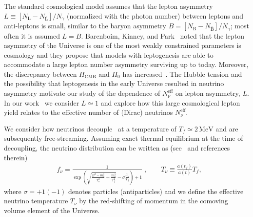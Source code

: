 The standard cosmological model assumes that the lepton asymmetry $L\equiv  [N_\mathrm{L}-N_{\overline{\mathrm{L}}}] /N_\gamma $  (normalized with the photon number) 
between leptons and anti-leptons is small, similar to the baryon asymmetry $B=[N_\mathrm{B}-N_{\overline{\mathrm{B}}}]/N_\gamma $; most often it is assumed $L=B$. Barenboim, Kinney, and Park~\cite{Barenboim:2016shh,Barenboim:2017dfq} noted that the lepton asymmetry of the Universe is one of the most weakly constrained parameters is cosmology and they propose that models with leptogenesis are able to accommodate a large lepton number asymmetry surviving up to today.  Moreover, the discrepancy between $H_\mathrm{CMB}$ and $H_0$ has increased~\cite{riess2018new,Riess:2018byc,Planck:2018vyg}. The Hubble tension and the possibility that leptogenesis in the early Universe resulted in neutrino asymmetry motivate our study of the dependence of $N_\nu^{\mathrm{eff}}$ on lepton asymmetry, $L$. In our work~\cite{Yang:2018oqg} we consider $L\simeq 1$ and explore how this large cosmological lepton yield relates to the effective number of (Dirac) neutrinos $N^{\mathrm{eff}}_\nu$. 

 We consider how neutrinos decouple~\cite{Birrell:2014gea} at a temperature of $T_f\simeq 2\,\mathrm{MeV}$ and are subsequently free-streaming. Assuming exact thermal equilibrium at the time of decoupling, the neutrino distribution can be   written as (see~\cite{Birrell:2012gg} and references therein)
\begin{align}
\label{fnudef}
&f_\nu=\frac{1}{\exp{\left(\sqrt{\frac{E^2-m_\nu^2}{T_\nu^2}+\frac{m^2_\nu}{T^2_f}}-\sigma\frac{\mu_\nu}{T_f}\right)+1}}\;,\qquad T_\nu\equiv\frac{a(t_f)}{a(t)}T_f,
\end{align}
where $\sigma=+1(-1)$ denotes particles (antiparticles) and we define the effective neutrino temperature $T_\nu$  by the red-shifting of momentum in the comoving volume element of the Universe.

